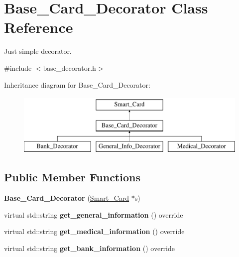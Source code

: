 \hypertarget{classBase__Card__Decorator}{}\section{Base\+\_\+\+Card\+\_\+\+Decorator Class Reference}
\label{classBase__Card__Decorator}


Just simple decorator.  




{\ttfamily \#include $<$base\+\_\+decorator.\+h$>$}

Inheritance diagram for Base\+\_\+\+Card\+\_\+\+Decorator\+:\begin{figure}[H]
\begin{center}
\leavevmode
\includegraphics[height=3.000000cm]{classBase__Card__Decorator}
\end{center}
\end{figure}
\subsection*{Public Member Functions}
\begin{DoxyCompactItemize}
\item 
\mbox{\label{classBase__Card__Decorator_af25648b0e9cdee9b46f82dbe81e3180f}} 
{\bfseries Base\+\_\+\+Card\+\_\+\+Decorator} (\mbox{\hyperlink{classSmart__Card}{Smart\+\_\+\+Card}} $\ast$s)
\item 
\mbox{\label{classBase__Card__Decorator_aa2122fce72c68c372192a548f1cb371c}} 
virtual std\+::string {\bfseries get\+\_\+general\+\_\+information} () override
\item 
\mbox{\label{classBase__Card__Decorator_ade292caa83a47707c056fe916fafe4f0}} 
virtual std\+::string {\bfseries get\+\_\+medical\+\_\+information} () override
\item 
\mbox{\label{classBase__Card__Decorator_ad93b8c6bc4dcfdd28bdc36c5c133155f}} 
virtual std\+::string {\bfseries get\+\_\+bank\+\_\+information} () override
\end{DoxyCompactItemize}
